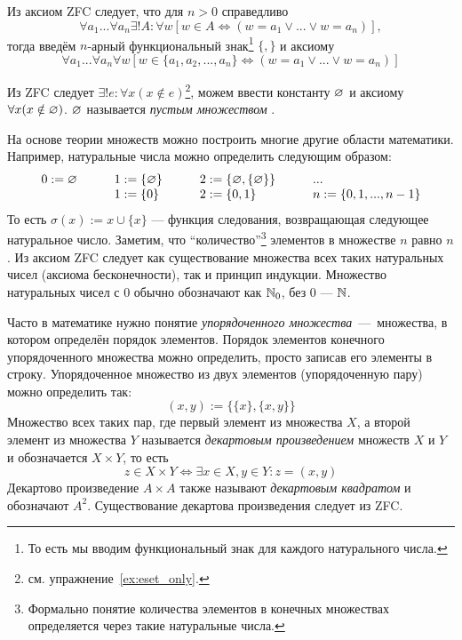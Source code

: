 Из аксиом ZFC следует, что для $n>0$ справедливо
\[
  \forall a_1...\forall a_{n}\exists !A:\forall w
    [w\in A\iff (w=a_1\lor...\lor w=a_{n})],
\]
тогда введём $n$-арный функциональный знак\footnote{
  То есть мы вводим функциональный знак для каждого натурального числа.}
$\{,\}$ и аксиому
\[
  \forall a_1...\forall a_{n}\forall w
  [w\in \{a_1,a_2,...,a_{n}\}\iff (w=a_1\lor ...\lor w=a_{n})]
\]

Из ZFC следует ${\exists !e:\forall x(x\notin e)}$\footnote{
  см. упражнение~\ref{ex:eset_only}.},
можем ввести константу $\varnothing$ и аксиому $\forall x(x\notin \varnothing)$.
$\varnothing$ называется {\it пустым множеством}
.

На основе теории множеств можно построить многие другие области математики.
Например, натуральные числа можно определить следующим образом:
\[ \begin{array}{llll}
    0 :=\varnothing\qquad & 1  :=\{\varnothing\}\qquad & 2  :=\{\varnothing,\{\varnothing\}\}\qquad & ... \\
                    & 1:=\{0\}\qquad       & 2:=\{0,1\}
                    & n:=\{0,1,...,n-1\}
  \end{array}
\]
То есть $\sigma(x):=x\cup \{x\}$ --- функция следования,
возвращающая следующее натуральное число. Заметим, что ``количество''\footnote{
  Формально понятие количества элементов в конечных множествах определяется
  через такие натуральные числа.} элементов
в множестве $n$ равно $n$. Из аксиом ZFC следует как существование множества
всех таких натуральных чисел (аксиома бесконечности), так и принцип индукции.
Множество натуральных чисел с $0$ обычно обозначают как $\mathbb N_0$,
без $0$ --- $\mathbb N$.

Часто в математике нужно понятие {\it упорядоченного множества}~---~множества,
в котором определён порядок элементов. Порядок элементов
конечного упорядоченного множества можно
определить, просто записав его элементы в строку.
Упорядоченное множество из двух элементов (упорядоченную пару)
можно определить так:
\[
  (x,y):=\{\{x\},\{x,y\}\}
\]
Множество
всех таких пар, где первый элемент из множества $X$, а второй элемент
из множества $Y$ называется {\it декартовым произведением}
 множеств
$X$ и $Y$ и
обозначается $X\times Y$, то есть
\[
  z\in X\times Y\iff \exists x\in X,y\in Y:z=(x,y)
\]
Декартово произведение $A\times A$ также называют {\it декартовым квадратом}
и обозначают $A^{2}$. Существование декартова произведения следует из ZFC.

